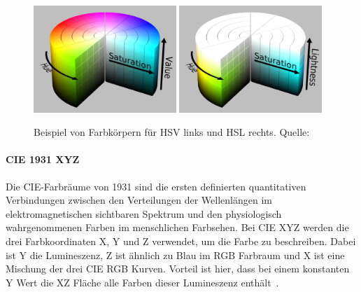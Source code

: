 \documentclass[12pt, a4paper, ngerman]{article}
\begin{document}
\begin{figure}
  \centering
  \includegraphics[width=0.48\textwidth]{Grafiken/HSV_Zylinder.png}
  \includegraphics[width=0.48\textwidth]{Grafiken/HSL_Zylinder.png}
  \caption{Beispiel von Farbkörpern für HSV links und HSL rechts. Quelle: ~\cite{HSL_and_HSV_2023}}
  \label{fig:HSV_HSL}
\end{figure}

\paragraph{CIE 1931 XYZ}
Die CIE-Farbräume von 1931 sind die ersten definierten quantitativen Verbindungen zwischen den Verteilungen 
der Wellenlängen im elektromagnetischen sichtbaren Spektrum und den physiologisch wahrgenommenen Farben im menschlichen Farbsehen. 
Bei CIE XYZ werden die drei Farbkoordinaten X, Y und Z verwendet, um die Farbe zu beschreiben.
Dabei ist Y die Lumineszenz, Z ist ähnlich zu Blau im RGB Farbraum und X ist eine Mischung der drei CIE RGB Kurven.
Vorteil ist hier, dass bei einem konstanten Y Wert die XZ Fläche alle Farben dieser Lumineszenz enthält~\cite{CIE_1931_color_space_2023}.
\end{document}
